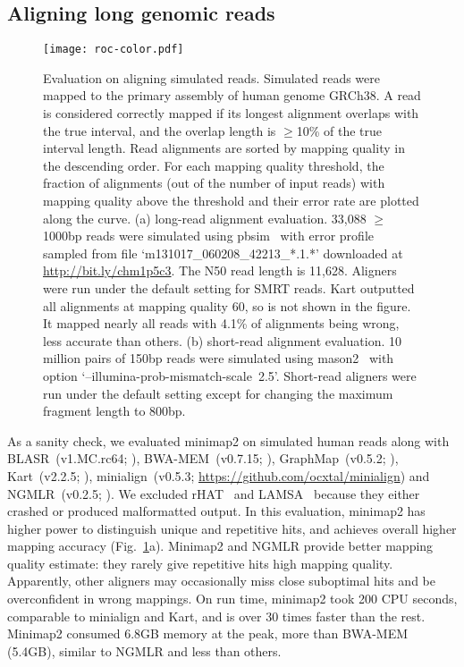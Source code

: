 \documentclass{bioinfo}
\begin{document}
\subsection{Aligning long genomic reads}\label{sec:long-genomic}

\begin{figure}[!tb]
\centering
\texttt{[image: roc-color.pdf]}
\caption{Evaluation on aligning simulated reads. Simulated reads were mapped 
to the primary assembly of human genome GRCh38. A read is considered correctly
mapped if its longest alignment overlaps with the true interval, and the
overlap length is $\ge$10\% of the true interval length.  Read alignments are
sorted by mapping quality in the descending order. For each mapping quality
threshold, the fraction of alignments (out of the number of input reads) with
mapping quality above the threshold and their error rate are
plotted along the curve. (a) long-read alignment evaluation. 33,088 $\ge$1000bp
reads were simulated using pbsim~\citep{Ono:2013aa} with error profile sampled
from file `m131017\_060208\_42213\_*.1.*' downloaded at
\href{http://bit.ly/chm1p5c3}{http://bit.ly/chm1p5c3}. The N50 read length is
11,628. Aligners were run under the default setting for SMRT reads.
Kart outputted all alignments at mapping quality 60, so is not shown in the
figure. It mapped nearly all reads with 4.1\% of alignments being wrong, less
accurate than others.  (b) short-read alignment evaluation. 10 million pairs of
150bp reads were simulated using mason2~\citep{Holtgrewe:2010aa} with option
`\mbox{--illumina-prob-mismatch-scale 2.5}'. Short-read aligners were run under
the default setting except for changing the maximum fragment length to
800bp.}\label{fig:eval}
\end{figure}

As a sanity check, we evaluated minimap2 on simulated human reads along with
BLASR~(v1.MC.rc64; \citealp{Chaisson:2012aa}),
BWA-MEM~(v0.7.15; \citealp{Li:2013aa}),
GraphMap~(v0.5.2; \citealp{Sovic:2016aa}),
Kart~(v2.2.5; \citealp{Lin:2017aa}),
minialign~(v0.5.3; \href{https://github.com/ocxtal/minialign}{https://github.com/ocxtal/minialign}) and
NGMLR~(v0.2.5; \citealp{Sedlazeck169557}). We excluded rHAT~\citep{Liu:2016ab}
and LAMSA~\citep{Liu:2017aa} because they either
crashed or produced malformatted output. In this evaluation, minimap2 has
higher power to distinguish unique and repetitive hits, and achieves overall
higher mapping accuracy (Fig.~\ref{fig:eval}a). Minimap2 and
NGMLR provide better mapping quality estimate: they rarely give repetitive hits
high mapping quality.  Apparently, other aligners may
occasionally miss close suboptimal hits and be overconfident in wrong mappings.
On run time, minimap2 took 200 CPU seconds, comparable to minialign and Kart, and is over
30 times faster than the rest.  Minimap2 consumed 6.8GB memory at the peak,
more than BWA-MEM (5.4GB), similar to NGMLR and less than others.
\end{document}
